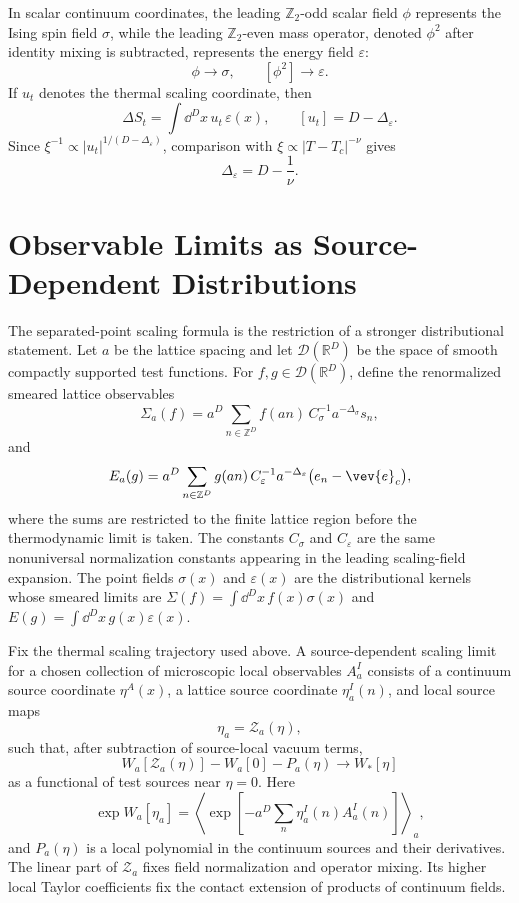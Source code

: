 In scalar continuum coordinates, the leading \(\mathbb Z_2\)-odd scalar field
\(\phi\) represents the Ising spin field \(\sigma\), while the leading
\(\mathbb Z_2\)-even mass operator, denoted \(\phi^2\) after identity mixing is
subtracted, represents the energy field \(\varepsilon\):
\[
  \phi \longrightarrow \sigma,
  \qquad
  [\phi^2]\longrightarrow\varepsilon .
\]
If \(u_t\) denotes the thermal scaling coordinate, then
\[
  \Delta S_t=\int\dd^D x\,u_t\,\varepsilon(x),
  \qquad
  [u_t]=D-\Delta_\varepsilon .
\]
Since \(\xi^{-1}\propto |u_t|^{1/(D-\Delta_\varepsilon)}\), comparison with
\(\xi\propto |T-T_c|^{-\nu}\) gives
\[
  \Delta_\varepsilon
  =
  D-\frac1\nu .
\]

\section{Observable Limits as Source-Dependent Distributions}

The separated-point scaling formula is the restriction of a stronger
distributional statement.  Let \(a\) be the lattice spacing and let
\(\mathcal D(\mathbb R^D)\) be the space of smooth compactly supported test
functions.  For \(f,g\in\mathcal D(\mathbb R^D)\), define the renormalized
smeared lattice observables
\[
  \Sigma_a(f)
  =
  a^D\sum_{n\in\mathbb Z^D}
  f(an)\,C_\sigma^{-1}a^{-\Delta_\sigma}s_n,
\]
and
\[
  E_a(g)
  =
  a^D\sum_{n\in\mathbb Z^D}
  g(an)\,C_\varepsilon^{-1}a^{-\Delta_\varepsilon}
  \bigl(e_n-\vev{e}_c\bigr),
\]
where the sums are restricted to the finite lattice region before the
thermodynamic limit is taken.  The constants \(C_\sigma\) and
\(C_\varepsilon\) are the same nonuniversal normalization constants appearing
in the leading scaling-field expansion.  The point fields \(\sigma(x)\) and
\(\varepsilon(x)\) are the distributional kernels whose smeared limits are
\(\Sigma(f)=\int\dd^Dx\,f(x)\sigma(x)\) and
\(E(g)=\int\dd^Dx\,g(x)\varepsilon(x)\).

\begin{definition}
Fix the thermal scaling trajectory used above.  A source-dependent scaling
limit for a chosen collection of microscopic local observables \(A_a^I\)
consists of a continuum source coordinate \(\eta^A(x)\), a lattice source
coordinate \(\eta_a^I(n)\), and local source maps
\[
  \eta_a=\mathcal Z_a(\eta),
\]
such that, after subtraction of source-local vacuum terms,
\begin{equation}
  W_a[\mathcal Z_a(\eta)]-W_a[0]-P_a(\eta)
  \longrightarrow
  W_\ast[\eta]
  \label{eq:ising-source-dependent-scaling-limit}
\end{equation}
as a functional of test sources near \(\eta=0\).  Here
\[
  \exp W_a[\eta_a]
  =
  \left\langle
    \exp\left[
      -a^D\sum_n\eta_a^I(n)A_a^I(n)
    \right]
  \right\rangle_a ,
\]
and \(P_a(\eta)\) is a local polynomial in the continuum sources and their
derivatives.  The linear part of \(\mathcal Z_a\) fixes field normalization
and operator mixing.  Its higher local Taylor coefficients fix the contact
extension of products of continuum fields.
\end{definition}

